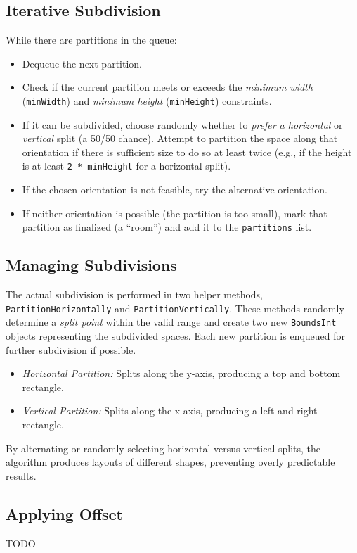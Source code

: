 \documentclass[a4paper, 12pt, one column, aas_macros]{article}
\begin{document}
\subsection{Iterative Subdivision}
While there are partitions in the queue:
\begin{itemize}
  \item Dequeue the next partition.
  \item Check if the current partition meets or exceeds the \emph{minimum width} (\texttt{minWidth}) and \emph{minimum height} (\texttt{minHeight}) constraints.
  \item If it can be subdivided, choose randomly whether to \emph{prefer a horizontal} or \emph{vertical} split (a 50/50 chance). Attempt to partition the space along that orientation if there is sufficient size to do so at least twice (e.g., if the height is at least \texttt{2 * minHeight} for a horizontal split).
  \item If the chosen orientation is not feasible, try the alternative orientation.
  \item If neither orientation is possible (the partition is too small), mark that partition as finalized (a ``room'') and add it to the \texttt{partitions} list.
\end{itemize}

\subsection{Managing Subdivisions}
The actual subdivision is performed in two helper methods, \texttt{PartitionHorizontally} and \texttt{PartitionVertically}. These methods randomly determine a \emph{split point} within the valid range and create two new \texttt{BoundsInt} objects representing the subdivided spaces. Each new partition is enqueued for further subdivision if possible.

\begin{itemize}
  \item \emph{Horizontal Partition:} Splits along the y-axis, producing a top and bottom rectangle.
  \item \emph{Vertical Partition:} Splits along the x-axis, producing a left and right rectangle.
\end{itemize}

By alternating or randomly selecting horizontal versus vertical splits, the algorithm produces layouts of different shapes, preventing overly predictable results.

\subsection{Applying Offset}
TODO
\end{document}
